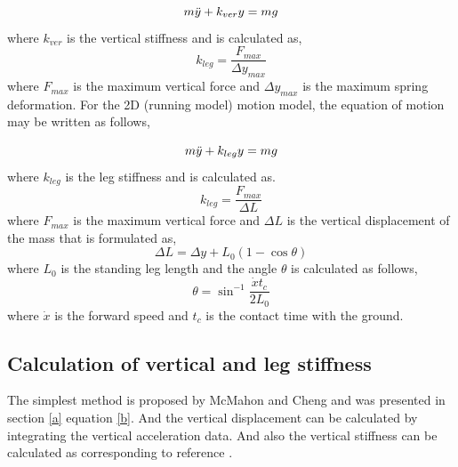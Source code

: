 \documentclass[extendedabs]{AAVL}
\begin{document}
\begin{equation}
        m \Ddot{y} + k_{ver}y = mg
\end{equation}
where $k_{ver}$ is the vertical stiffness and is calculated
as,
\begin{equation}
\label{b}
    k_{leg} = \frac{F_{max}}{\Delta y_{max}}
\end{equation}
where $F_{max}$ is the maximum vertical force and $\Delta y_{max}$
is the maximum spring deformation. 
For the 2D (running model) motion model, the equation of motion may be written as follows,

\begin{equation}
        m \Ddot{y} + k_{leg}y = mg
\end{equation}
where $k_{leg}$ is the leg stiffness and is calculated as.
\begin{equation}
    k_{leg} = \frac{F_{max}}{\Delta L}
\end{equation}
where $F_{max}$ is the maximum vertical force and $\Delta L$ is the vertical displacement of the mass that is formulated as,
\begin{equation}
    \Delta L = \Delta y + L_0(1-\cos{\theta})
\end{equation}
where $L_{0}$ is the standing leg length and the angle $\theta$ is calculated as follows,
\begin{equation}
  \theta = \sin^{-1}\frac{\Dot{x}t_{c}}{2L_{0}}
\end{equation}
where $\Dot{x}$ is the forward speed and $t_{c}$ is the contact time with the ground.

\subsection{Calculation of vertical and leg stiffness}
The simplest method is proposed by McMahon and Cheng \cite{e} and was presented in section \ref{a} equation \eqref{b}. And the vertical displacement can be calculated by integrating the vertical acceleration data. And also the vertical stiffness can be calculated as corresponding to reference \cite{f}. 
  
\end{document}
